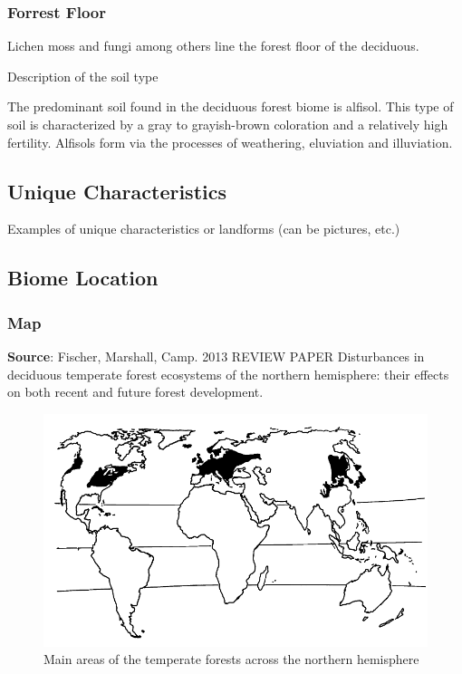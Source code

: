 \documentclass[paper=a4, fontsize=11pt]{article}
\begin{document}
\subsubsection{Forrest Floor}
Lichen moss and fungi among others line the forest floor of the deciduous.




Description of the soil type

The predominant soil found in the deciduous forest biome is alfisol. This type of soil is characterized by a 
gray to grayish-brown coloration and a relatively high fertility. Alfisols form via the processes of 
weathering, eluviation and illuviation.

\subsection{Unique Characteristics}
Examples of unique characteristics or landforms (can be pictures, etc.)

\subsection{Biome Location}

\subsubsection{Map}
\textbf{Source}: Fischer, Marshall, Camp. 2013 REVIEW PAPER
Disturbances in deciduous temperate forest ecosystems
of the northern hemisphere: their effects on both recent
and future forest development.

\begin{figure}[h]
\includegraphics[scale=.5]{DeciduousMap.png}
\caption{Main areas of the temperate forests across the northern hemisphere}
\end{figure}
\end{document}
